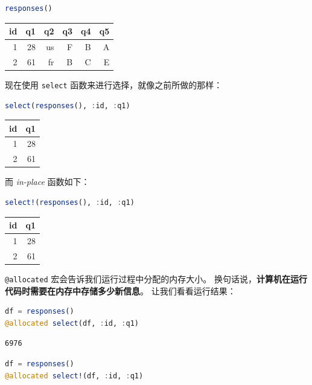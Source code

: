 \documentclass[
  notoc %
]{tufte-book}
\newcommand{\passthrough}[1]{#1}
\begin{document}
\begin{lstlisting}[language=Julia]
responses()
\end{lstlisting}

\begin{longtable}[]{@{}rrrrrr@{}}
\toprule
id & q1 & q2 & q3 & q4 & q5 \\
\midrule
\endhead
1 & 28 & us & F & B & A \\
2 & 61 & fr & B & C & E \\
\bottomrule
\end{longtable}

现在使用 \passthrough{\lstinline!select!}
函数来进行选择，就像之前所做的那样：

\begin{lstlisting}[language=Julia]
select(responses(), :id, :q1)
\end{lstlisting}

\begin{longtable}[]{@{}rr@{}}
\toprule
id & q1 \\
\midrule
\endhead
1 & 28 \\
2 & 61 \\
\bottomrule
\end{longtable}

而 \emph{in-place} 函数如下：

\begin{lstlisting}[language=Julia]
select!(responses(), :id, :q1)
\end{lstlisting}

\begin{longtable}[]{@{}rr@{}}
\toprule
id & q1 \\
\midrule
\endhead
1 & 28 \\
2 & 61 \\
\bottomrule
\end{longtable}

\passthrough{\lstinline!@allocated!}
宏会告诉我们运行过程中分配的内存大小。
换句话说，\textbf{计算机在运行代码时需要在内存中存储多少新信息}。
让我们看看运行结果：

\begin{lstlisting}[language=Julia]
df = responses()
@allocated select(df, :id, :q1)
\end{lstlisting}

\begin{lstlisting}
6976
\end{lstlisting}

\begin{lstlisting}[language=Julia]
df = responses()
@allocated select!(df, :id, :q1)
\end{lstlisting}
\end{document}
